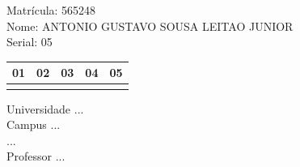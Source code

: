 \documentclass[10pt,a4paper,twocolumn]{report}
\begin{document}
Matrícula: 565248\\ Nome: ANTONIO GUSTAVO SOUSA LEITAO JUNIOR \\ Serial: 05\\
\begin{tabular}{|l|l|l|l|l|}\hline
01  &02  &03  &04  &05 \\ \hline 
 & & & & \\ \hline 
\end{tabular}
 \cleardoublepage 

\begin{flushleft}
Universidade ...\\
Campus ...\\
...\\
Professor ...\\
\end{flushleft}
\end{document}
